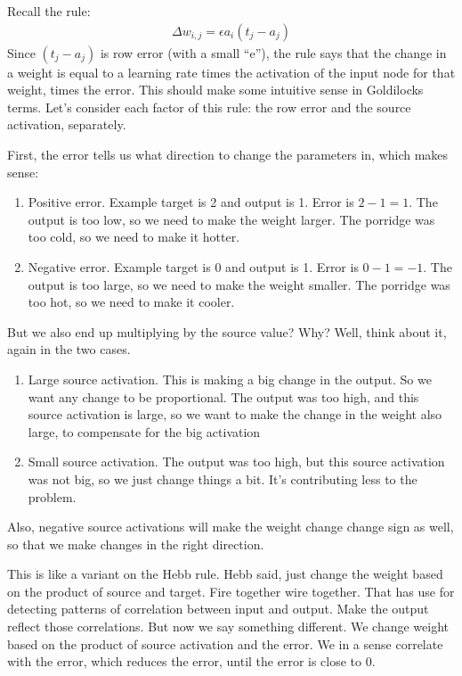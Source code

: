 Recall the rule:
\begin{eqnarray*}
\Delta w_{i,j}  =  \epsilon a_i (t_j - a_j)
\end{eqnarray*}
Since $(t_j - a_j)$ is row error  (with a small ``e''), the rule says that the change in a weight is equal to a learning rate times the activation of the input node for that weight, times the error. This should make some intuitive sense in Goldilocks terms. Let's consider each factor of this rule: the row error and the source activation, separately.

First, the error tells us what direction to change the parameters in, which makes sense:
\begin{enumerate}
\item Positive error. Example target is 2 and output is 1. Error is $2-1 = 1$. The output is too low, so we need to make the weight larger. The porridge was too cold, so we need to make it hotter. 
\item Negative error. Example target is 0 and output is 1. Error is $0-1 = -1$. The output is too large, so we need to make the weight smaller. The porridge was too hot, so we need to make it cooler. 
\end{enumerate}

But we also end up multiplying by the source value? Why? Well, think about it, again in the two cases.
\begin{enumerate}
\item Large source activation. This is making a big change in the output. So we want any change to be proportional. The output was too high, and this source activation is large, so we want to make the change in the weight also large, to compensate for the big activation
\item Small source activation. The output was too high, but this source activation was not big, so we just change things a bit. It's contributing less to the problem.
\end{enumerate}
Also, negative source activations will make the weight change change sign as well, so that we make changes in the right direction. %

This is like a variant on the Hebb rule. Hebb said, just change the weight based on the product of source and target. Fire together wire together. That has use for detecting patterns of correlation between input and output. Make the output reflect those correlations. But now we say something different. We change weight based on the product of source activation and the error. We in a sense correlate with the error, which reduces the error, until the error is close to 0.

